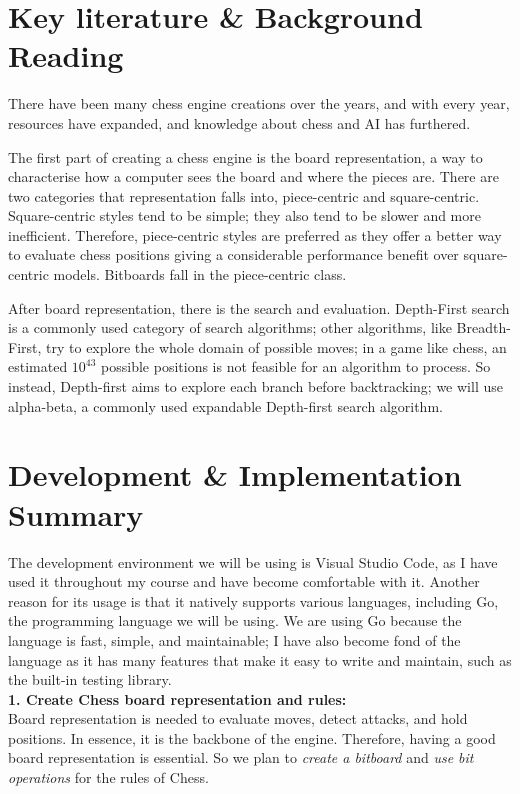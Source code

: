 \documentclass{article}
\begin{document}
\section{Key literature \& Background Reading}
There have been many chess engine creations over the years, and with every year, resources have expanded, and knowledge about chess and AI has furthered. 

The first part of creating a chess engine is the board representation, a way to characterise how a computer sees the board and where the pieces are. There are two categories that representation falls into, piece-centric and square-centric\cite{chessprog:board}. Square-centric styles tend to be simple; they also tend to be slower and more inefficient. Therefore, piece-centric styles are preferred as they offer a better way to evaluate chess positions giving a considerable performance benefit over square-centric models. Bitboards fall in the piece-centric class\cite{craftychess:board}.

After board representation, there is the search and evaluation. Depth-First search is a commonly used category of search algorithms; other algorithms, like Breadth-First, try to explore the whole domain of possible moves; in a game like chess, an estimated \(10^{43}\)\cite{history:search} possible positions is not feasible for an algorithm to process. So instead, Depth-first aims to explore each branch before backtracking; we will use alpha-beta, a commonly used expandable Depth-first search algorithm\cite{chessprog:search}.

\section{Development \& Implementation Summary} \label{imp}
The development environment we will be using is Visual Studio Code\cite{vscode}, as I have used it throughout my course and have become comfortable with it. Another reason for its usage is that it natively supports various languages, including Go\cite{vscode:languages}, the programming language we will be using. We are using Go because the language is fast, simple, and maintainable\cite{Go:popularity}; I have also become fond of the language as it has many features that make it easy to write and maintain, such as the built-in testing library\cite{golang}.\\

\noindent\textbf{1. Create Chess board representation and rules:}\\
Board representation is needed to evaluate moves, detect attacks, and hold positions. In essence, it is the backbone of the engine. Therefore, having a good board representation is essential. So we plan to \emph{create a bitboard} and \emph{use bit operations}\cite{craftychess:board} for the rules of Chess.
\end{document}
